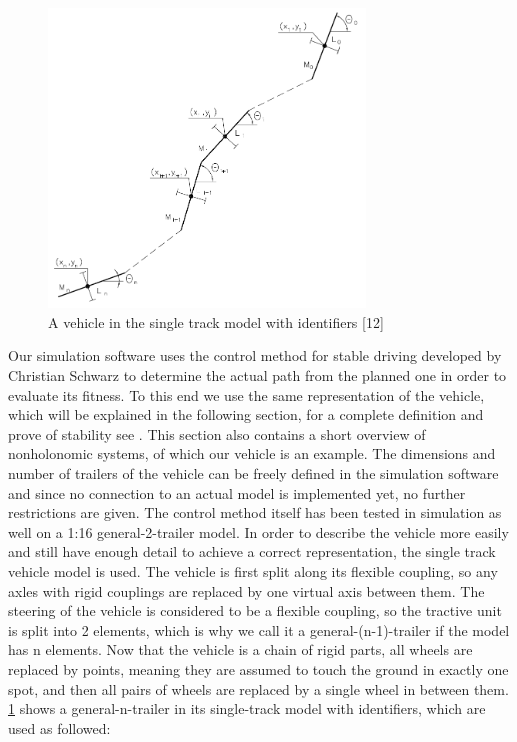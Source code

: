 \begin{figure}[t]
\centering
\includegraphics[width=0.75\textwidth]{./Chapters/Figures/single-track-model.png}
\caption{A vehicle in the single track model with identifiers [12] \label{pic:single-track-model}}
\end{figure}

Our simulation software uses the control method for stable driving developed by Christian Schwarz to determine the actual path from the planned one in order to evaluate its fitness. To this end we use the same representation of the vehicle, which will be explained in the following section, for a complete definition and prove of stability see \cite{12}. This section also contains a short overview of nonholonomic systems, of which our vehicle is an example.
The dimensions and number of trailers of the vehicle can be freely defined in the simulation software and since no connection to an actual model is implemented yet, no further restrictions are given. The control method itself has been tested in simulation as well on a 1:16 general-2-trailer model. In order to describe the vehicle more easily and still have enough detail to achieve a correct representation, the single track vehicle model is used\cite{27}. The vehicle is first split along its flexible coupling, so any axles with rigid couplings are replaced by one virtual axis between them. The steering of the vehicle is considered to be a flexible coupling, so the tractive unit is split into 2 elements, which is why we call it a general-(n-1)-trailer if the model has n elements. Now that the vehicle is a chain of rigid parts, all wheels are replaced by points, meaning they are assumed to touch the ground in exactly one spot, and then all pairs of wheels are replaced by a single wheel in between them. \ref{pic:single-track-model} shows a general-n-trailer in its single-track model with identifiers, which are used as followed:

